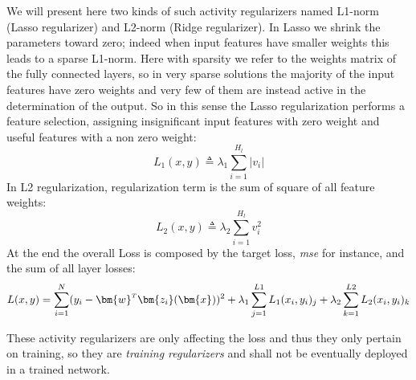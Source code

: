 We will present here two kinds of such activity regularizers named L1-norm (Lasso regularizer) and L2-norm (Ridge regularizer).
In Lasso we shrink the parameters toward zero; indeed when input features have smaller weights this leads to a sparse L1-norm. Here with sparsity we refer to the weights matrix of the fully connected layers, so in very sparse solutions the majority of the input features have zero weights and very few of them are instead active in the determination of the output.
So in this sense the Lasso regularization performs a feature selection, assigning insignificant input features with zero weight and useful features with a non zero weight:
\begin{equation}
    L_1(x,y) \triangleq \lambda_1 \sum_{i=1}^{H_l} \left| v_i \right|
\end{equation}
In L2 regularization, regularization term is the sum of square of all feature weights:
\begin{equation}
    L_2(x,y) \triangleq \lambda_2 \sum_{i=1}^{H_l} v_i^2
\end{equation}
At the end the overall Loss is composed by the target loss, \textit{mse} for instance, and the sum of all layer losses:
\begin{equation}
    L(x,y) = \sum_{i=1}^N (y_i - \transpose{\bm{w}}\bm{z_i}(\bm{x}))^2 + \lambda_1 \sum_{j=1}^{L1} L_1(x_i,y_i)_j + \lambda_2 \sum_{k=1}^{L2} L_2(x_i,y_i)_k
\end{equation}

These activity regularizers are only affecting the loss and thus they only pertain on training, so they are \textit{training regularizers} and shall not be eventually deployed in a trained network.





